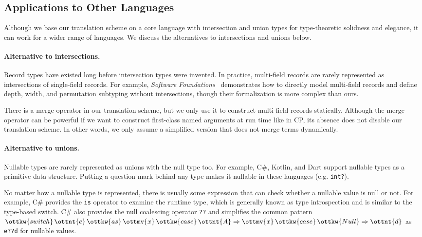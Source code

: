 \subsection{Applications to Other Languages}

Although we base our translation scheme on a core language with intersection and
union types for type-theoretic solidness and elegance, it can work for a wider
range of languages. We discuss the alternatives to intersections and unions
below.

\paragraph{Alternative to intersections.}
Record types have existed long before intersection types were invented. In
practice, multi-field records are rarely represented as intersections of
single-field records. For example, \emph{Software Foundations}~\citep{plf}
demonstrates how to directly model multi-field records and define depth, width,
and permutation subtyping without intersections, though their formalization is
more complex than ours.

There is a merge operator in our translation scheme, but we only use it to
construct multi-field records statically. Although the merge operator can be
powerful if we want to construct first-class named arguments at run time like in
CP, its absence does not disable our translation scheme. In other words, we only
assume a simplified version that does not merge terms dynamically.

\paragraph{Alternative to unions.}
Nullable types are rarely represented as unions with the null type too. For
example, C\#, Kotlin, and Dart support nullable types as a primitive data
structure. Putting a question mark behind any type makes it nullable in these
languages (e.g. \lstinline{int?}).

No matter how a nullable type is represented, there is usually some expression
that can check whether a nullable value is null or not. For example, C\#
provides the \lstinline[language={[Sharp]C}]{is} operator to examine the runtime
type, which is generally known as type introspection and is similar to the
type-based switch. C\# also provides the null coalescing operator \lstinline{??}
and simplifies the common pattern $\ottkw{switch} \, \ottnt{e} \, \ottkw{as} \, \ottmv{x} \, \ottkw{case} \, \ottnt{A}  \Rightarrow  \ottmv{x} \, \ottkw{case} \, \ottkw{Null}  \Rightarrow  \ottnt{d}$
as \lstinline{e??d} for nullable values.

